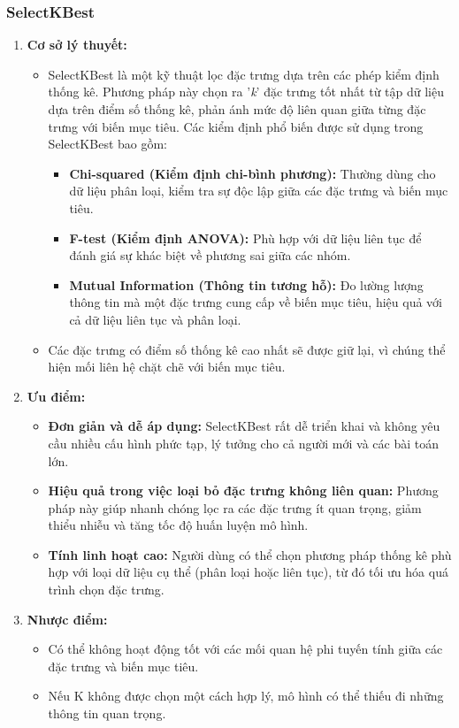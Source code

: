 \documentclass[13pt]{article}
\begin{document}
\subsubsection{SelectKBest}
\begin{enumerate}
    \item \textbf{Cơ sở lý thuyết: }
    \begin{itemize}
        \item SelectKBest là một kỹ thuật lọc đặc trưng dựa trên các phép kiểm định thống kê. Phương pháp này chọn ra '\textit{k}' đặc trưng tốt nhất từ tập dữ liệu dựa trên điểm số thống kê, phản ánh mức độ liên quan giữa từng đặc trưng với biến mục tiêu. Các kiểm định phổ biến được sử dụng trong SelectKBest bao gồm:
        \begin{itemize}
            \item \textbf{Chi-squared (Kiểm định chi-bình phương): } Thường dùng cho dữ liệu phân loại, kiểm tra sự độc lập giữa các đặc trưng và biến mục tiêu.
            \item \textbf{F-test (Kiểm định ANOVA): } Phù hợp với dữ liệu liên tục để đánh giá sự khác biệt về phương sai giữa các nhóm.
            \item \textbf{Mutual Information (Thông tin tương hỗ): } Đo lường lượng thông tin mà một đặc trưng cung cấp về biến mục tiêu, hiệu quả với cả dữ liệu liên tục và phân loại.
        \end{itemize}
        \item Các đặc trưng có điểm số thống kê cao nhất sẽ được giữ lại, vì chúng thể hiện mối liên hệ chặt chẽ với biến mục tiêu.
    \end{itemize}
    \item \textbf{Ưu điểm: }
    \begin{itemize}
        \item \textbf{Đơn giản và dễ áp dụng: } SelectKBest rất dễ triển khai và không yêu cầu nhiều cấu hình phức tạp, lý tưởng cho cả người mới và các bài toán lớn.
        \item \textbf{Hiệu quả trong việc loại bỏ đặc trưng không liên quan: } Phương pháp này giúp nhanh chóng lọc ra các đặc trưng ít quan trọng, giảm thiểu nhiễu và tăng tốc độ huấn luyện mô hình.
        \item \textbf{Tính linh hoạt cao: } Người dùng có thể chọn phương pháp thống kê phù hợp với loại dữ liệu cụ thể (phân loại hoặc liên tục), từ đó tối ưu hóa quá trình chọn đặc trưng.
    \end{itemize}
    \item \textbf{Nhược điểm: }
    \begin{itemize}
        \item Có thể không hoạt động tốt với các mối quan hệ phi tuyến tính giữa các đặc trưng và biến mục tiêu. 
        \item Nếu K không được chọn một cách hợp lý, mô hình có thể thiếu đi những thông tin quan trọng.
    \end{itemize}
\end{enumerate}
\end{document}
